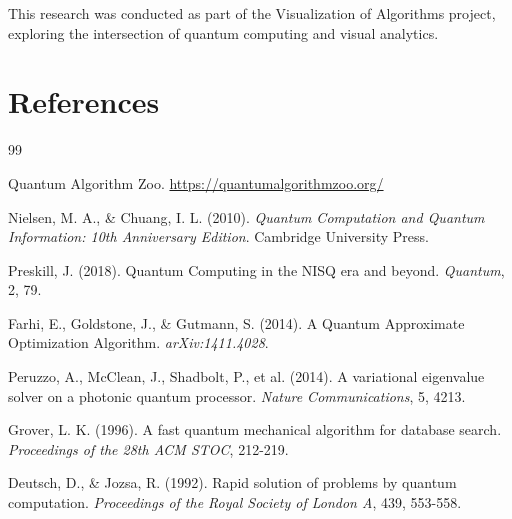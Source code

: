 \documentclass[12pt,a4paper]{article}
\begin{document}
This research was conducted as part of the Visualization of Algorithms project, exploring the intersection of quantum computing and visual analytics.

\newpage

\section*{References}

\begin{thebibliography}{99}


	\item Quantum Algorithm Zoo. \url{https://quantumalgorithmzoo.org/}

	\item Nielsen, M. A., \& Chuang, I. L. (2010). \textit{Quantum Computation and Quantum Information: 10th Anniversary Edition}. Cambridge University Press.

	\item Preskill, J. (2018). Quantum Computing in the NISQ era and beyond. \textit{Quantum}, 2, 79.

	\item Farhi, E., Goldstone, J., \& Gutmann, S. (2014). A Quantum Approximate Optimization Algorithm. \textit{arXiv:1411.4028}.

	\item Peruzzo, A., McClean, J., Shadbolt, P., et al. (2014). A variational eigenvalue solver on a photonic quantum processor. \textit{Nature Communications}, 5, 4213.

	\item Grover, L. K. (1996). A fast quantum mechanical algorithm for database search. \textit{Proceedings of the 28th ACM STOC}, 212-219.

	\item Deutsch, D., \& Jozsa, R. (1992). Rapid solution of problems by quantum computation. \textit{Proceedings of the Royal Society of London A}, 439, 553-558.

\end{thebibliography}
\end{document}
